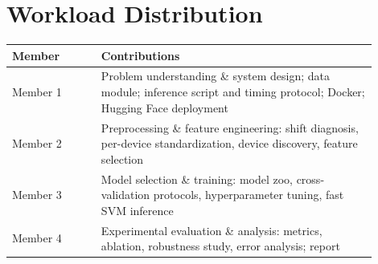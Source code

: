 \section{Workload Distribution}
\begin{table}[h]
\centering
\small
\begin{tabular}{p{0.22\linewidth}p{0.68\linewidth}}
\toprule
Member & Contributions \\
\midrule
Member 1 & Problem understanding \& system design; data module; inference script and timing protocol; Docker; Hugging Face deployment \\
Member 2 & Preprocessing \& feature engineering: shift diagnosis, per-device standardization, device discovery, feature selection \\
Member 3 & Model selection \& training: model zoo, cross-validation protocols, hyperparameter tuning, fast SVM inference \\
Member 4 & Experimental evaluation \& analysis: metrics, ablation, robustness study, error analysis; report \\
\bottomrule
\end{tabular}
\end{table}
